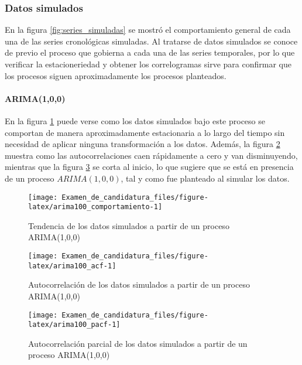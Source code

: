 \documentclass[
]{article}
\begin{document}
\subsubsection{Datos simulados}

En la figura \ref{fig:series_simuladas} se mostró el comportamiento
general de cada una de las series cronológicas simuladas. Al tratarse de
datos simulados se conoce de previo el proceso que gobierna a cada una
de las series temporales, por lo que verificar la estacioneriedad y
obtener los correlogramas sirve para confirmar que los procesos siguen
aproximadamente los procesos planteados.

\paragraph{ARIMA(1,0,0)}

En la figura \ref{fig:arima100_comportamiento} puede verse como los
datos simulados bajo este proceso se comportan de manera aproximadamente
estacionaria a lo largo del tiempo sin necesidad de aplicar ninguna
transformación a los datos. Además, la figura \ref{fig:arima100_acf}
muestra como las autocorrelaciones caen rápidamente a cero y van
disminuyendo, mientras que la figura \ref{fig:arima100_pacf} se corta al
inicio, lo que sugiere que se está en presencia de un proceso
\(ARIMA(1,0,0)\), tal y como fue planteado al simular los datos.

\begin{figure}[H]
\texttt{[image: Examen\_de\_candidatura\_files/figure-latex/arima100\_comportamiento-1]} \caption{Tendencia de los datos simulados a partir de un proceso ARIMA(1,0,0)}\label{fig:arima100_comportamiento}
\end{figure}

\begin{figure}[H]
\texttt{[image: Examen\_de\_candidatura\_files/figure-latex/arima100\_acf-1]} \caption{Autocorrelación de los datos simulados a partir de un proceso ARIMA(1,0,0)}\label{fig:arima100_acf}
\end{figure}

\begin{figure}[H]
\texttt{[image: Examen\_de\_candidatura\_files/figure-latex/arima100\_pacf-1]} \caption{Autocorrelación parcial de los datos simulados a partir de un proceso ARIMA(1,0,0)}\label{fig:arima100_pacf}
\end{figure}
\end{document}
